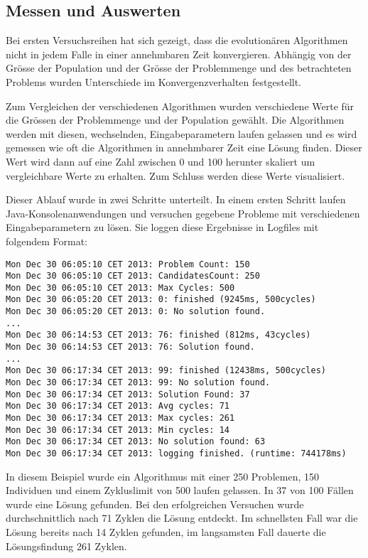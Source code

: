 \subsection{Messen und Auswerten}
Bei ersten Versuchsreihen hat sich gezeigt, dass die evolutionären Algorithmen nicht in jedem Falle in einer annehmbaren Zeit konvergieren. Abhängig von der Grösse der Population und der Grösse der Problemmenge und des betrachteten Problems wurden Unterschiede im Konvergenzverhalten festgestellt.

Zum Vergleichen der verschiedenen Algorithmen wurden verschiedene Werte für die Grössen der Problemmenge und der Population gewählt. Die Algorithmen werden mit diesen, wechselnden, Eingabeparametern laufen gelassen und es wird gemessen wie oft die Algorithmen in annehmbarer Zeit eine Lösung finden. Dieser Wert wird dann auf eine Zahl zwischen 0 und 100 herunter skaliert um vergleichbare Werte zu erhalten. Zum Schluss werden diese Werte visualisiert.

Dieser Ablauf wurde in zwei Schritte unterteilt. In einem ersten Schritt laufen Java-Konsolenanwendungen und versuchen gegebene Probleme mit verschiedenen Eingabeparametern zu lösen. Sie loggen diese Ergebnisse in Logfiles mit folgendem Format:

\begin{lstlisting}[caption={Log Format}, label={lst:log_format}]
Mon Dec 30 06:05:10 CET 2013: Problem Count: 150
Mon Dec 30 06:05:10 CET 2013: CandidatesCount: 250
Mon Dec 30 06:05:10 CET 2013: Max Cycles: 500
Mon Dec 30 06:05:20 CET 2013: 0: finished (9245ms, 500cycles)
Mon Dec 30 06:05:20 CET 2013: 0: No solution found.
...
Mon Dec 30 06:14:53 CET 2013: 76: finished (812ms, 43cycles)
Mon Dec 30 06:14:53 CET 2013: 76: Solution found.
...
Mon Dec 30 06:17:34 CET 2013: 99: finished (12438ms, 500cycles)
Mon Dec 30 06:17:34 CET 2013: 99: No solution found.
Mon Dec 30 06:17:34 CET 2013: Solution Found: 37
Mon Dec 30 06:17:34 CET 2013: Avg cycles: 71
Mon Dec 30 06:17:34 CET 2013: Max cycles: 261
Mon Dec 30 06:17:34 CET 2013: Min cycles: 14
Mon Dec 30 06:17:34 CET 2013: No solution found: 63
Mon Dec 30 06:17:34 CET 2013: logging finished. (runtime: 744178ms)
\end{lstlisting}

In diesem Beispiel wurde ein Algorithmus mit einer 250 Problemen, 150 Individuen und einem Zykluslimit von 500 laufen gelassen. In 37 von 100 Fällen wurde eine Lösung gefunden. Bei den erfolgreichen Versuchen wurde durchschnittlich nach 71 Zyklen die Lösung entdeckt. Im schnellsten Fall war die Lösung bereits nach 14 Zyklen gefunden, im langsamsten Fall dauerte die Lösungsfindung 261 Zyklen.


